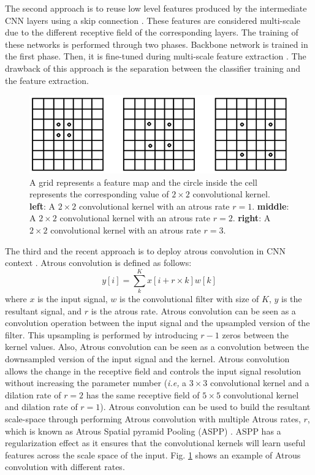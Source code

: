 The second approach is to reuse low level features produced by the intermediate CNN layers using a skip connection \cite{chen2014semantic}\cite{hariharan2015hypercolumns}. These features are considered multi-scale due to the different receptive field of the corresponding layers. The training of these networks is performed through two phases. Backbone network is trained in the first phase.  Then, it is fine-tuned during multi-scale feature extraction \cite{long2015fully}\cite{lin2017feature}. The drawback of this approach is the separation between the classifier training and the feature extraction.\\
\begin{center}
    \begin{figure}
    \centerline{\includegraphics[width=\textwidth]{Figures/AtrousConv.PNG}}
    \caption{A grid represents a feature map and the circle inside the cell represents the corresponding value of $2\times 2$ convolutional kernel. \textbf{left}: A $2\times 2$ convolutional kernel with an atrous rate $r=1$. \textbf{middle}: A $2\times 2$ convolutional kernel with an atrous rate $r=2$. \textbf{right}: A $2\times 2$ convolutional kernel with an atrous rate $r=3$.}
    \label{AtrousConv}
    \end{figure}
    \end{center}
The third and the  recent approach is to deploy atrous convolution \cite{holschneider1990real} in CNN context \cite{chen2017deeplab}\cite{giusti2013fast}. Atrous convolution is defined as follows: \[y[i]=\sum_{k}^{K} x[i+r\times k] w[k]\] where $x$ is the input signal, $w$ is the convolutional filter with size of $K$, $y$ is the resultant signal, and $r$ is the atrous rate. Atrous convolution can be seen as a convolution  operation between the input signal and the upsampled version of the filter. This upsampling is performed by introducing $r-1$ zeros between the kernel values. Also, Atrous convolution can be seen as a  convolution between the downsampled version of the input signal and the kernel. Atrous convolution allows the change in the receptive field and controls the input signal resolution without increasing the parameter number \cite{chen2017rethinking} (\textit{i.e,} a $3\times 3$ convolutional kernel and a dilation rate of $r=2$ has the same receptive field of $5\times 5$ convolutional kernel and dilation rate of $r=1$). Atrous convolution can be used to build the resultant scale-space through  performing Atrous convolution with multiple Atrous rates, $r$, which is known as Atrous Spatial pyramid Pooling (ASPP) \cite{chen2017deeplab}. ASPP has a regularization effect as it ensures that the convolutional kernels will learn  useful features   across the scale space of the input. Fig. \ref{AtrousConv} shows an example of  Atrous convolution with different rates. 


